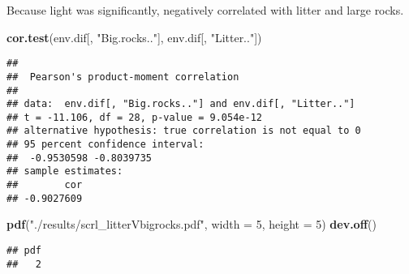 \documentclass[]{article}
\newenvironment{Shaded}{\begin{snugshade}}{\end{snugshade}}
\newcommand{\KeywordTok}[1]{\textcolor[rgb]{0.13,0.29,0.53}{\textbf{#1}}}
\newcommand{\DataTypeTok}[1]{\textcolor[rgb]{0.13,0.29,0.53}{#1}}
\newcommand{\DecValTok}[1]{\textcolor[rgb]{0.00,0.00,0.81}{#1}}
\newcommand{\StringTok}[1]{\textcolor[rgb]{0.31,0.60,0.02}{#1}}
\newcommand{\NormalTok}[1]{#1}
\begin{document}
Because light was significantly, negatively correlated with litter and
large rocks.

\begin{Shaded}
\begin{Highlighting}[]
\KeywordTok{cor.test}\NormalTok{(env.dif[, }\StringTok{"Big.rocks.."}\NormalTok{], env.dif[, }\StringTok{"Litter.."}\NormalTok{])}
\end{Highlighting}
\end{Shaded}

\begin{verbatim}
## 
##  Pearson's product-moment correlation
## 
## data:  env.dif[, "Big.rocks.."] and env.dif[, "Litter.."]
## t = -11.106, df = 28, p-value = 9.054e-12
## alternative hypothesis: true correlation is not equal to 0
## 95 percent confidence interval:
##  -0.9530598 -0.8039735
## sample estimates:
##        cor 
## -0.9027609
\end{verbatim}

\begin{Shaded}
\begin{Highlighting}[]
\KeywordTok{pdf}\NormalTok{(}\StringTok{"./results/scrl_litterVbigrocks.pdf"}\NormalTok{, }\DataTypeTok{width =} \DecValTok{5}\NormalTok{, }\DataTypeTok{height =} \DecValTok{5}\NormalTok{)}
\KeywordTok{dev.off}\NormalTok{()}
\end{Highlighting}
\end{Shaded}

\begin{verbatim}
## pdf 
##   2
\end{verbatim}
\end{document}
